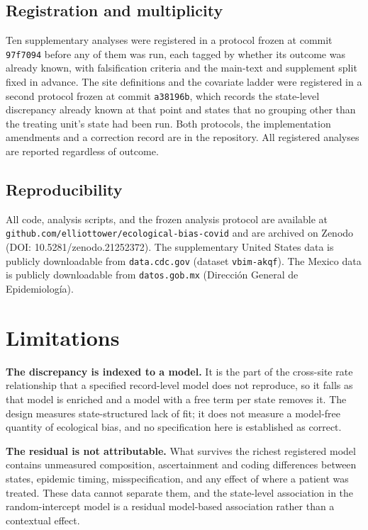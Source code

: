 \documentclass[11pt]{article}
\begin{document}
\subsection{Registration and multiplicity}

Ten supplementary analyses were registered in a protocol frozen at
commit \texttt{97f7094} before any of them was run, each tagged by
whether its outcome was already known, with falsification criteria and
the main-text and supplement split fixed in advance.  The site
definitions and the covariate ladder were registered in a second
protocol frozen at commit \texttt{a38196b}, which records the
state-level discrepancy already known at that point and states that no
grouping other than the treating unit's state had been run.  Both
protocols, the implementation amendments and a correction record are in
the repository.  All registered analyses are reported regardless of
outcome.

\subsection{Reproducibility}

All code, analysis scripts, and the frozen analysis protocol are
available at
\texttt{github.com/elliottower/ecological-bias-covid}
and are archived on Zenodo (DOI: 10.5281/zenodo.21252372).
The supplementary United States data is publicly downloadable from \texttt{data.cdc.gov} (dataset
\texttt{vbim-akqf}).  The Mexico data is publicly downloadable from
\texttt{datos.gob.mx} (Direcci\'{o}n General de Epidemiolog\'{i}a).


\section{Limitations}

\textbf{The discrepancy is indexed to a model.}  It is the part of the
cross-site rate relationship that a specified record-level model does
not reproduce, so it falls as that model is enriched and a model with a
free term per state removes it.  The design measures state-structured
lack of fit; it does not measure a model-free quantity of ecological
bias, and no specification here is established as correct.

\textbf{The residual is not attributable.}  What survives the richest
registered model contains unmeasured composition, ascertainment and
coding differences between states, epidemic timing, misspecification,
and any effect of where a patient was treated.  These data cannot
separate them, and the state-level association in the random-intercept
model is a residual model-based association rather than a contextual
effect.
\end{document}
